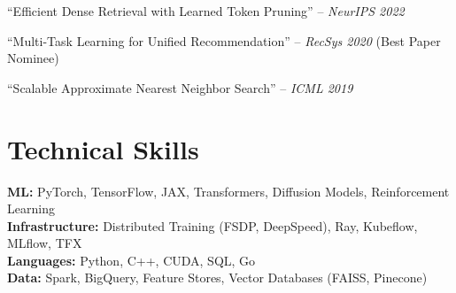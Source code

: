 \documentclass[11pt,letterpaper]{article}
\begin{document}
\begin{enumerate}[nosep, leftmargin=18pt, label={[\arabic*]}]
    \item ``Efficient Dense Retrieval with Learned Token Pruning'' -- \textit{NeurIPS 2022}
    \item ``Multi-Task Learning for Unified Recommendation'' -- \textit{RecSys 2020} (Best Paper Nominee)
    \item ``Scalable Approximate Nearest Neighbor Search'' -- \textit{ICML 2019}
\end{enumerate}

\section{Technical Skills}

\textbf{ML:} PyTorch, TensorFlow, JAX, Transformers, Diffusion Models, Reinforcement Learning \\
\textbf{Infrastructure:} Distributed Training (FSDP, DeepSpeed), Ray, Kubeflow, MLflow, TFX \\
\textbf{Languages:} Python, C++, CUDA, SQL, Go \\
\textbf{Data:} Spark, BigQuery, Feature Stores, Vector Databases (FAISS, Pinecone)
\end{document}
